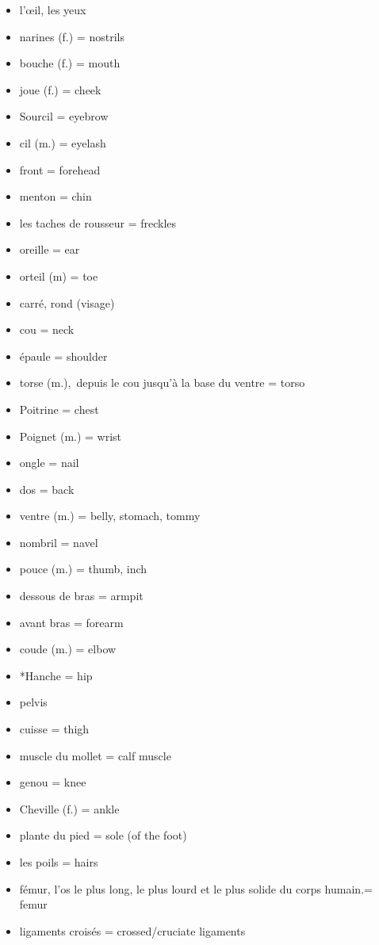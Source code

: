 \begin{itemize}
\item
  l'œil, les yeux
\item
  narines (f.) = nostrils
\item
  bouche (f.) = mouth
\item
  joue (f.) = cheek
\item
  {Sourcil = eyebrow~}
\item
  {cil (m.) = eyelash}
\item
  {front = forehead}
\item
  {menton = chin}
\item
  {les taches de rousseur = freckles}
\item
  {oreille = ear}
\item
  {orteil (m) = toe}
\item
  {carré, rond (}{visage)}
\item
  {cou = neck}
\item
  {épaule = shoulder}
\item
  {torse (m.),~}{depuis le cou jusqu'à la base du ventre} {= torso}
\item
  {Poitrine = chest}
\item
  {Poignet (m.) = wrist}
\item
  {ongle = nail}
\item
  {dos = back}
\item
  {ventre (m.) = belly, stomach, tommy}
\item
  {nombril = navel}
\item
  {pouce (m.) = thumb, inch}
\item
  {dessous de bras = armpit}
\item
  {avant bras = forearm}
\item
  {coude (m.) = elbow}
\item
  {*Hanche = hip}
\item
  {pelvis}
\item
  {cuisse = thigh}
\item
  {muscle du mollet = calf muscle}
\item
  {genou = knee}
\item
  {Cheville (f.) = ankle}
\item
  {plante du pied = sole (of the foot)}
\item
  {les poils = hairs}
\item
  {fémur,} {l'os le plus long, le plus lourd et le plus solide du corps
  humain.}{= femur}
\item
  {ligaments croisés = crossed/cruciate ligaments}
\end{itemize}

